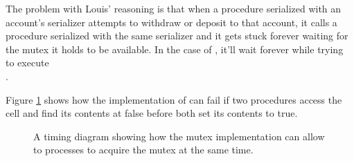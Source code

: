 \begin{exe}[3.45]
    The problem with Louis’ reasoning is that when a procedure serialized with 
    an account’s serializer attempts to withdraw or deposit to that account, it 
    calls a procedure serialized with the same serializer and it gets stuck 
    forever waiting for the mutex it holds to be available. In the case of 
    , it’ll wait forever while trying to execute \\
    .
\end{exe}

\begin{exe}[3.46]
    Figure \ref{3.46fig} shows how the implementation of  
    can fail if two procedures access the cell and find its contents at false 
    before both set its contents to true.
    \begin{figure}
        \centering
        \caption{A timing diagram showing how the mutex implementation can allow 
        to processes to acquire the mutex at the same time.}
        \label{3.46fig}
    \end{figure}
\end{exe}


